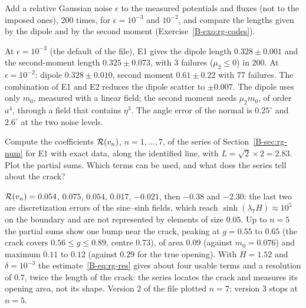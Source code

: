 \label{exo:cc-rg-noise}
%
Add a relative Gaussian noise $\epsilon$ to the measured potentials and fluxes
(not to the imposed ones), 200 times, for $\epsilon=10^{-3}$ and $10^{-2}$, and
compare the lengths given by the dipole and by the second moment
(Exercise~\ref{B-exo:rg-codes}).
\begin{solution}
At $\epsilon=10^{-3}$ (the default of the file), E1 gives the dipole length
$0.328\pm0.001$ and the second-moment length $0.325\pm0.073$, with 3 failures
($\mu_2\le0$) in 200. At $\epsilon=10^{-2}$: dipole $0.328\pm0.010$, second
moment $0.61\pm0.22$ with 77 failures. The combination of E1 and E2 reduces the
dipole scatter to $\pm0.007$. The dipole uses only $m_0$, measured with a linear
field; the second moment needs $\mu_2m_0$, of order $a^4$, through a field that
contains $\eta^3$. The angle error of the normal is $0.25^\circ$ and
$2.6^\circ$ at the two noise levels.
\end{solution}

\label{exo:cc-rg-sine}
%
Compute the coefficients $\mathcal{R}(v_n)$, $n=1,\dots,7$, of the series of
Section~\ref{B-sec:rg-num} for E1 with exact data, along the identified line,
with $L=\sqrt2\times2=2.83$. Plot the partial sums. Which terms can be used, and
what does the series tell about the crack?
\begin{solution}
$\mathcal{R}(v_n)=0.054$, $0.075$, $0.054$, $0.017$, $-0.021$, then $-0.38$ and
$-2.30$: the last two are discretization errors of the sine--sinh fields, which
reach $\sinh(\lambda_7H)\approx10^5$ on the boundary and are not represented by
elements of size $0.05$. Up to $n=5$ the partial sums show one bump near the
crack, peaking at $g=0.55$ to $0.65$ (the crack covers $0.56\le g\le0.89$,
centre $0.73$), of area $0.09$ (against $m_0=0.076$) and maximum $0.11$ to $0.12$
(against $0.29$ for the true opening). With $H=1.52$ and $\delta=10^{-3}$ the estimate~\eqref{B-eq:rg-res}
gives about four usable terms and a resolution of $0.7$, twice the length of the
crack: the series locates the crack and measures its opening area, not its
shape. Version 2 of the file plotted $n=7$; version 3 stops at $n=5$.
\end{solution}

